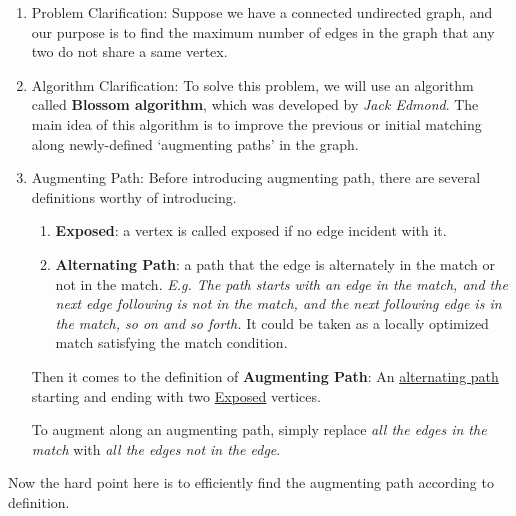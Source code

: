 \documentclass{article}
\begin{document}
\begin{enumerate}[1.]
\item Problem Clarification: Suppose we have a connected undirected graph, and our purpose is to find the maximum number of edges in the graph that any two do not share a same vertex.

\item Algorithm Clarification: To solve this problem, we will use an algorithm called \textbf{Blossom algorithm}, which was developed by \textit{Jack Edmond}. The main idea of this algorithm is to improve the previous or initial matching along newly-defined `augmenting paths' in the graph.

\item Augmenting Path: Before introducing augmenting path, there are several definitions worthy of introducing.
	\begin{enumerate}
	\item \textbf{Exposed}: a vertex is called exposed if no edge incident with it.
	\item \textbf{Alternating Path}: a path that the edge is alternately in the match or not in the match. \textit{E.g. The path starts with an edge in the match, and the next edge following is not in the match, and the next following edge is in the match, so on and so forth.} It could be taken as a locally optimized match satisfying the match condition.
	\end{enumerate}
	Then it comes to the definition of \textbf{Augmenting Path}: An \underline{alternating path} starting and ending with two \underline{Exposed} vertices. 

	To augment along an augmenting path, simply replace \textit{all the edges in the match} with \textit{all the edges not in the edge}. 
\end{enumerate}


\begin{Algorithm}[find max matching\label{problem30}]
	\BlankLine
\end{Algorithm}
Now the hard point here is to efficiently find the augmenting path according to definition. 
\end{document}
